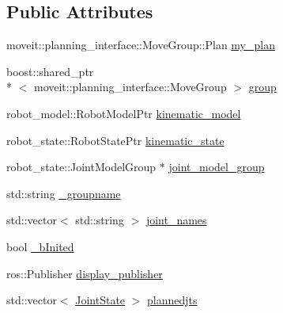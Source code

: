 \subsection*{Public Attributes}
\begin{DoxyCompactItemize}
\item 
moveit\-::planning\-\_\-interface\-::\-Move\-Group\-::\-Plan \hyperlink{classMoveitPlanning_a981942759c10b3127a9d8d80ae54ef44}{my\-\_\-plan}
\item 
boost\-::shared\-\_\-ptr\\*
$<$ moveit\-::planning\-\_\-interface\-::\-Move\-Group $>$ \hyperlink{classMoveitPlanning_a8c2fe5775408e0e3afe6288f9b9facd5}{group}
\item 
robot\-\_\-model\-::\-Robot\-Model\-Ptr \hyperlink{classMoveitPlanning_a9311edd62f690d6fb5398e62df2df18c}{kinematic\-\_\-model}
\item 
robot\-\_\-state\-::\-Robot\-State\-Ptr \hyperlink{classMoveitPlanning_af7d64860fac3ae411904770755904345}{kinematic\-\_\-state}
\item 
robot\-\_\-state\-::\-Joint\-Model\-Group $\ast$ \hyperlink{classMoveitPlanning_a1e4e53d7560c0148712e7cc00b314085}{joint\-\_\-model\-\_\-group}
\item 
std\-::string \hyperlink{classMoveitPlanning_a56cf116dfd39c4ba4fb16df4b70c8a29}{\-\_\-groupname}
\item 
std\-::vector$<$ std\-::string $>$ \hyperlink{classMoveitPlanning_a36a6b85e1318172afbcce875a73cea10}{joint\-\_\-names}
\item 
bool \hyperlink{classMoveitPlanning_a64c359d7383623d1dc1976060a5a8e73}{\-\_\-b\-Inited}
\item 
ros\-::\-Publisher \hyperlink{classMoveitPlanning_a51be3d19d403e4872374062888171a22}{display\-\_\-publisher}
\item 
std\-::vector$<$ \hyperlink{RCS_8h_aa4adb93a26caa4dacba9c9614e283245}{Joint\-State} $>$ \hyperlink{classMoveitPlanning_ae0a57c1497f666564f307e1f53f2b974}{plannedjts}
\end{DoxyCompactItemize}


